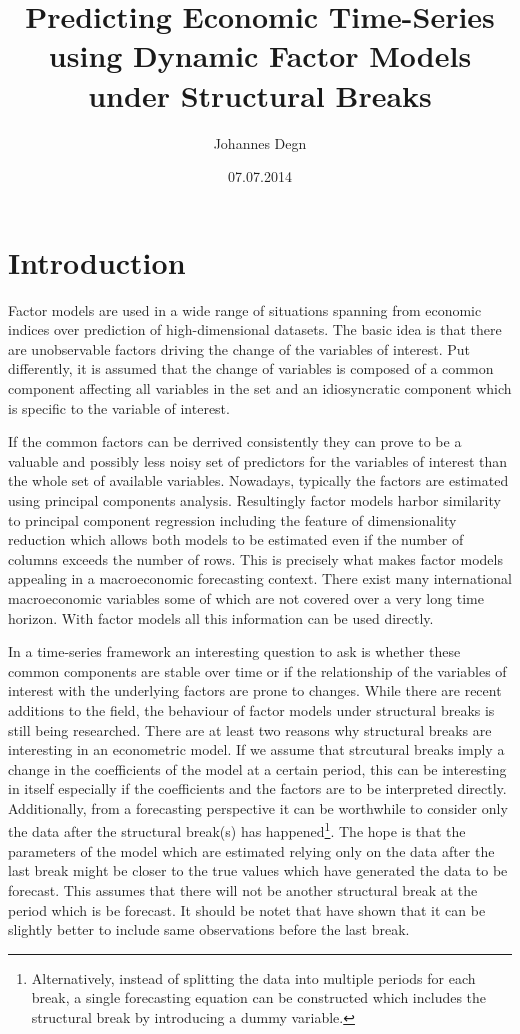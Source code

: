 \documentclass[11pt]{article}
\title{\textbf{Predicting Economic Time-Series using Dynamic Factor Models under Structural Breaks}}
\author{Johannes Degn}
\date{07.07.2014}
\begin{document}
\maketitle
\thispagestyle{empty}
\setcounter{page}{0}

\newpage
\tableofcontents
\newpage
\listoffigures
\listoftables
\newpage




\section{Introduction}
Factor models are used in a wide range of situations spanning from economic indices over prediction of high-dimensional datasets. The basic idea is that there are unobservable factors driving the change of the variables of interest. Put differently, it is assumed that the change of variables is composed of a common component affecting all variables in the set and an idiosyncratic component which is specific to the variable of interest.

If the common factors can be derrived consistently they can prove to be a valuable and possibly less noisy set of predictors for the variables of interest than the whole set of available variables. Nowadays, typically the factors are estimated using principal components analysis. Resultingly factor models harbor similarity to principal component regression including the feature of dimensionality reduction which allows both models to be estimated even if the number of columns exceeds the number of rows. This is precisely what makes factor models appealing in a macroeconomic forecasting context. There exist many international macroeconomic variables some of which are not covered over a very long time horizon. With factor models all this information can be used directly.

In a time-series framework an interesting question to ask is whether these common components are stable over time or if the relationship of the variables of interest with the underlying factors are prone to changes. While there are recent additions to the field, the behaviour of factor models under structural breaks is still being researched. There are at least two reasons why structural breaks are interesting in an econometric model. If we assume that strcutural breaks imply a change in the coefficients of the model at a certain period, this can be interesting in itself especially if the coefficients and the factors are to be interpreted directly. Additionally, from a forecasting perspective it can be worthwhile to consider only the data after the structural break(s) has happened\footnote{Alternatively, instead of splitting the data into multiple periods for each break, a single forecasting equation can be constructed which includes the structural break by introducing a dummy variable.}. The hope is that the parameters of the model which are estimated relying only on the data after the last break might be closer to the true values which have generated the data to be forecast. This assumes that there will not be another structural break at the period which is be forecast. It should be notet that \citet{pesaran2007selection} have shown that it can be slightly better to include same observations before the last break.
\end{document}
